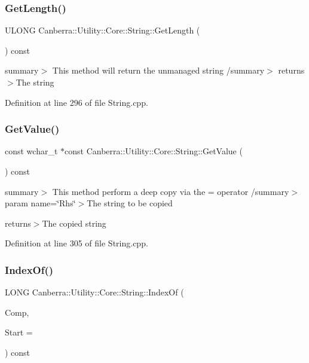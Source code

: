 \subsubsection{\texorpdfstring{Get\+Length()}{GetLength()}}
{\footnotesize\ttfamily U\+L\+O\+NG Canberra\+::\+Utility\+::\+Core\+::\+String\+::\+Get\+Length (\begin{DoxyParamCaption}{ }\end{DoxyParamCaption}) const}

summary$>$ This method will return the unmanaged string /summary$>$ returns$>$The string

Definition at line 296 of file String.\+cpp.

\mbox{\label{class_canberra_1_1_utility_1_1_core_1_1_string_a3781ab7af77afe59cee77ab1dfd22339_a3781ab7af77afe59cee77ab1dfd22339}} 
\subsubsection{\texorpdfstring{Get\+Value()}{GetValue()}}
{\footnotesize\ttfamily const wchar\+\_\+t $\ast$const Canberra\+::\+Utility\+::\+Core\+::\+String\+::\+Get\+Value (\begin{DoxyParamCaption}{ }\end{DoxyParamCaption}) const}

summary$>$ This method perform a deep copy via the = operator /summary$>$ param name=\char`\"{}\+Rhs\char`\"{}$>$The string to be copied

returns$>$The copied string

Definition at line 305 of file String.\+cpp.

\mbox{\label{class_canberra_1_1_utility_1_1_core_1_1_string_a457223b9476260d7b372bb16546d1433_a457223b9476260d7b372bb16546d1433}} 
\subsubsection{\texorpdfstring{Index\+Of()}{IndexOf()}\hspace{0.1cm}{\footnotesize\ttfamily [1/2]}}
{\footnotesize\ttfamily L\+O\+NG Canberra\+::\+Utility\+::\+Core\+::\+String\+::\+Index\+Of (\begin{DoxyParamCaption}\item[{const \hyperlink{class_canberra_1_1_utility_1_1_core_1_1_string}{String} \&}]{Comp,  }\item[{long}]{Start = {} }\end{DoxyParamCaption}) const}

